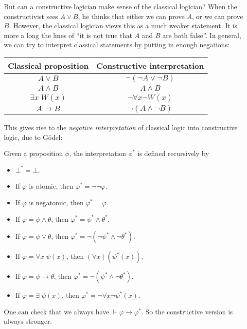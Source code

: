 \documentclass[a4paper]{article}
\begin{document}
But can a constructive logician make sense of the classical logician? When the constructivist sees $A \vee B$, he thinks that either we can prove $A$, or we can prove $B$. However, the classical logician views this as a much weaker statement. It is more a long the lines of ``it is not true that $A$ and $B$ are both false''. In general, we can try to interpret classical statements by putting in enough negations:
\begin{center}
  \begin{tabular}{cc}
    \toprule
    Classical proposition & Constructive interpretation\\
    \midrule
    $A \vee B$ & $\neg (\neg A \vee \neg B)$\\
    $A \wedge B$& $A \wedge B$\\
    $\exists x\; W(x)$ & $\neg \forall x \neg W(x)$\\
    $A \to B$ & $\neg (A \wedge \neg B)$\\
    \bottomrule
  \end{tabular}
\end{center}
This gives rise to the \emph{negative interpretation} of classical logic into constructive logic, due to G\"odel:
\begin{defi}
  Given a proposition $\phi$, the interpretation $\phi^*$ is defined recursively by
  \begin{itemize}
    \item $\bot^* = \bot$.
    \item If $\varphi$ is atomic, then $\varphi^* = \neg\neg \varphi$.
    \item If $\varphi$ is negatomic, then $\varphi^* = \varphi$.
    \item If $\varphi = \psi \wedge \theta$, then $\varphi^* = \psi^* \wedge \theta^*$.
    \item If $\varphi = \psi \vee \theta$, then $\varphi^* = \neg (\neg \psi^* \wedge \neg \theta^*)$.
    \item If $\varphi = \forall x\; \psi(x)$, then $(\forall x)(\psi^*(x))$.
    \item If $\varphi = \psi \to \theta$, then $\varphi^* = \neg(\psi^* \wedge \neg \theta^*)$.
    \item If $\varphi = \exists \; \psi(x)$, then $\varphi^* = \neg \forall x \neg \psi^*(x)$.
  \end{itemize}
\end{defi}
One can check that we always have $\vdash \varphi \to \varphi^*$. So the constructive version is always stronger.
\end{document}
